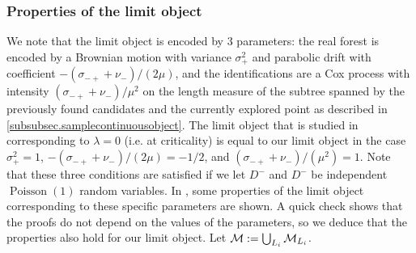 \subsubsection{Properties of the limit object}
We note that the limit object is encoded by $3$ parameters: the real forest is encoded by a Brownian motion with variance $\sigma_+^2$ and parabolic drift with coefficient $-(\sigma_{-+}+\nu_-)/(2\mu)$, and the identifications are a Cox process with intensity $(\sigma_{-+}+\nu_-)/\mu^2$ on the length measure of the subtree spanned by the previously found candidates and the currently explored point as described in \ref{subsubsec.samplecontinuousobject}. The limit object that is studied in \cite{Goldschmidt2019} corresponding to $\lambda=0$ (i.e. at criticality) is equal to our limit object in the case $\sigma_+^2=1$, $-(\sigma_{-+}+\nu_-)/(2\mu)=-1/2$, and $(\sigma_{-+}+\nu_-)/(\mu^2)=1$. Note that these three conditions are satisfied if we let $D^-$ and $D^-$ be independent $\operatorname{Poisson}(1)$ random variables. In \cite{Goldschmidt2019}, some properties of the limit object corresponding to these specific parameters are shown. A quick check shows that the proofs do not depend on the values of the parameters, so we deduce that the properties also hold for our limit object. Let ${\mathcal M}:=\bigcup_{L_i}{\mathcal M}_{L_i}$.

